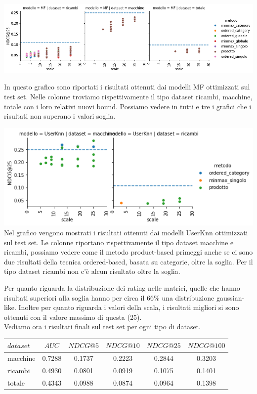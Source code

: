 \includegraphics[width=16cm]{figures/validazione_mf.png}

In questo grafico sono riportati i risultati ottenuti dai modelli MF ottimizzati sul test set. Nelle colonne troviamo rispettivamente il tipo dataset ricambi, macchine, totale con i loro relativi nuovi bound. Possiamo vedere in tutti e tre i grafici che i risultati non superano i valori soglia.

\includegraphics[width=16cm]{figures/validazione_userknn.png}\\
Nel grafico vengono mostrati i risultati ottenuti dai modelli UserKnn ottimizzati sul test set. Le colonne riportano rispettivamente il tipo dataset macchine e ricambi, possiamo vedere come il metodo product-based primeggi anche se ci sono due risultati della tecnica ordered-based, basata su categorie, oltre la soglia. Per il tipo dataset ricambi non c'è alcun risultato oltre la soglia.

Per quanto riguarda la distribuzione dei rating nelle matrici, quelle che hanno risultati superiori alla soglia hanno per circa il 66\% una distribuzione gaussian-like. Inoltre per quanto riguarda i valori della scala, i risultati migliori si sono ottenuti con il valore massimo di questa (25).\\
Vediamo ora i risultati finali sul test set per ogni tipo di dataset.\\

\begin{tabular}{|l|ccccc|}
    \toprule
    $dataset$  & $AUC$ & $NDCG@5$ & $NDCG@10$  & $NDCG@25$ & $NDCG@100$  \\
    \midrule
    macchine & 0.7288 & 0.1737 & 0.2223 & 0.2844 & 0.3203 \\
    ricambi  & 0.4930 &  0.0801 &    0.0919 &  0.1075 & 0.1401 \\
    totale  & 0.4343 &   0.0988  &  0.0874 &  0.0964 & 0.1398 \\
\bottomrule
\end{tabular}\\

